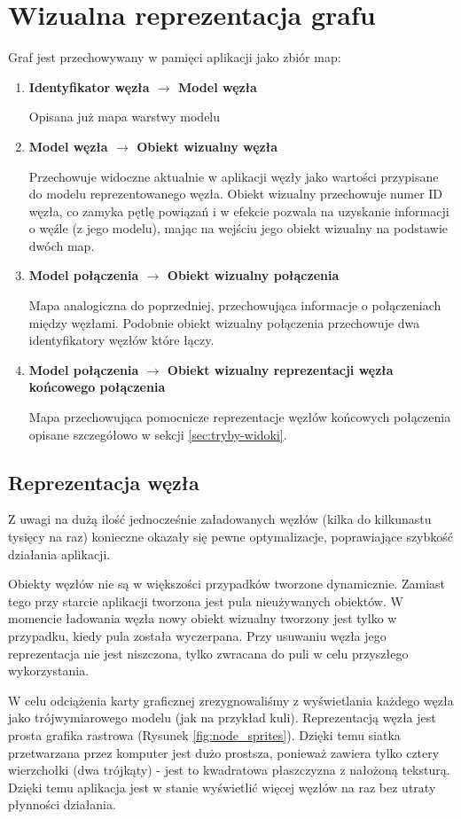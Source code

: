 \section{Wizualna reprezentacja grafu}
\label{sec:graf-reprezentacja}

\newcommand\mapitem[3]{
	\item \textbf{#1 $\to$ #2}

	#3
}

\noindent
Graf jest przechowywany w pamięci aplikacji jako zbiór map:
\begin{enumerate}[label=\textbullet]
	\mapitem{Identyfikator węzła}{Model węzła}{Opisana już mapa warstwy modelu}
	\mapitem{Model węzła}{Obiekt wizualny węzła}{Przechowuje widoczne aktualnie w aplikacji węzły jako wartości przypisane do modelu reprezentowanego węzła. Obiekt wizualny przechowuje numer ID węzła, co zamyka pętlę powiązań i w efekcie pozwala na uzyskanie informacji o węźle (z jego modelu), mając na wejściu jego obiekt wizualny na podstawie dwóch map.}
	\mapitem{Model połączenia}{Obiekt wizualny połączenia}{Mapa analogiczna do poprzedniej, przechowująca informacje o połączeniach między węzłami. Podobnie obiekt wizualny połączenia przechowuje dwa identyfikatory węzłów które łączy.}
	
	\mapitem{Model połączenia}{Obiekt wizualny reprezentacji węzła końcowego połączenia}{Mapa przechowująca pomocnicze reprezentacje węzłów końcowych połączenia opisane szczegółowo w sekcji \ref{sec:tryby-widoki}.}
\end{enumerate}

\subsection{Reprezentacja węzła} Z uwagi na dużą ilość jednocześnie załadowanych węzłów (kilka do kilkunastu tysięcy na raz) konieczne okazały się pewne optymalizacje, poprawiające szybkość działania aplikacji. 

Obiekty węzłów nie są w większości przypadków tworzone dynamicznie. Zamiast tego przy starcie aplikacji tworzona jest pula nieużywanych obiektów. W momencie ładowania węzła nowy obiekt wizualny tworzony jest tylko w przypadku, kiedy pula została wyczerpana. Przy usuwaniu węzła jego reprezentacja nie jest niszczona, tylko zwracana do puli w celu przyszłego wykorzystania.

W celu odciążenia karty graficznej zrezygnowaliśmy z wyświetlania każdego węzła jako trójwymiarowego modelu (jak na przykład kuli). Reprezentacją węzła jest prosta grafika rastrowa (Rysunek \ref{fig:node_sprites}). Dzięki temu siatka przetwarzana przez komputer jest dużo prostsza, ponieważ zawiera tylko cztery wierzchołki (dwa trójkąty) - jest to kwadratowa płaszczyzna z nałożoną teksturą. Dzięki temu aplikacja jest w stanie wyświetlić więcej węzłów na raz bez utraty płynności działania.


